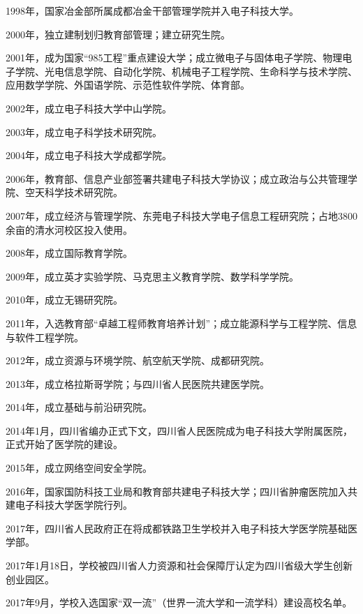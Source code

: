 \documentclass[UTF8]{ctexart}
\begin{document}
1998年，国家冶金部所属成都冶金干部管理学院并入电子科技大学。


2000年，独立建制划归教育部管理；建立研究生院。


2001年，成为国家“985工程”重点建设大学；成立微电子与固体电子学院、物理电子学院、光电信息学院、自动化学院、机械电子工程学院、生命科学与技术学院、应用数学学院、外国语学院、示范性软件学院、体育部。


2002年，成立电子科技大学中山学院。


2003年，成立电子科学技术研究院。


2004年，成立电子科技大学成都学院。


2006年，教育部、信息产业部签署共建电子科技大学协议；成立政治与公共管理学院、空天科学技术研究院。


2007年，成立经济与管理学院、东莞电子科技大学电子信息工程研究院；占地3800余亩的清水河校区投入使用。


2008年，成立国际教育学院。


2009年，成立英才实验学院、马克思主义教育学院、数学科学学院。


2010年，成立无锡研究院。


2011年，入选教育部“卓越工程师教育培养计划”；成立能源科学与工程学院、信息与软件工程学院。


2012年，成立资源与环境学院、航空航天学院、成都研究院。


2013年，成立格拉斯哥学院；与四川省人民医院共建医学院。


2014年，成立基础与前沿研究院。


2014年1月，四川省编办正式下文，四川省人民医院成为电子科技大学附属医院，正式开始了医学院的建设。 


2015年，成立网络空间安全学院。


2016年，国家国防科技工业局和教育部共建电子科技大学；四川省肿瘤医院加入共建电子科技大学医学院行列。


2017年，四川省人民政府正在将成都铁路卫生学校并入电子科技大学医学院基础医学部。  


2017年1月18日，学校被四川省人力资源和社会保障厅认定为四川省级大学生创新创业园区。 


2017年9月，学校入选国家“双一流”（世界一流大学和一流学科）建设高校名单。 
\end{document}
